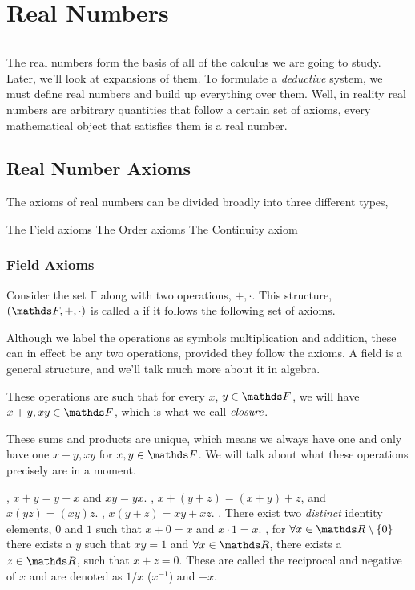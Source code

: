 \chapter{Real Numbers}

\begin{equation*}
\end{equation*}

The real numbers form the basis of all of the calculus we are going to study. Later, we'll look at expansions of them.
To formulate a \emph{deductive} system, we must define real numbers and build up everything over them. Well, in reality
real numbers are arbitrary quantities that follow a certain set of axioms, every mathematical object that satisfies
them is a real number.

\section{Real Number Axioms}

The axioms of real numbers can be divided broadly into three different types,

\begin{itemize}
    \ii The Field axioms
    \ii The Order axioms
    \ii The Continuity axiom
\end{itemize}

\subsection{Field Axioms}

Consider the set \(\mathbb{F}\) along with two operations, \(+, \cdot\).
This structure, \((\FF, +, \cdot)\) is called a  if it follows the following
set of axioms.

Although we label the operations as symbols multiplication and addition, these can in effect be 
any two operations, provided they follow the axioms. A field is a general structure, 
and we'll talk much more about it in algebra.

These operations are such that for every \(x\), \(y \in \FF\), we will have \(x + y, xy \in \FF\),
which is what we call \(\emph{closure}\).

These sums and products are unique, which means we always have one and only have one 
\(x+y, xy\) for \(x, y \in \FF\). We will talk about what these operations precisely are in 
a moment.

\begin{axioms}
    \ii {}, \(x+y = y+x\) and \(xy = yx\).
    \ii {}, \(x + (y+z) = (x+y) + z\), and \(x(yz) = (xy)z\).
    \ii {}, \(x(y + z) = xy + xz\).
    \ii {}. There exist two \emph{distinct} identity elements, \(0\) and \(1\) such that \(x + 0 = x\) and \(x \cdot 1 = x\).
    \ii {}, for \(\forall x \in \RR \setminus \{0\}\) there exists a \(y\) such that \(xy = 1\) and \(\forall x \in \RR\),
    there exists a \(z \in \RR\), such that \(x + z = 0\). These are called the reciprocal 
    and negative of \(x\) and are denoted as \(1/x\)  (\(x^{-1}\)) and \(-x\).
\end{axioms}
 
